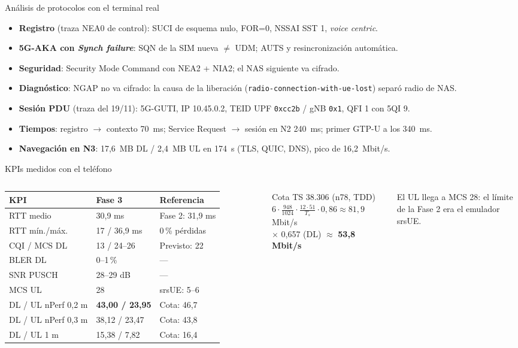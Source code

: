 \documentclass[aspectratio=169,10pt]{beamer}
\begin{document}
\begin{frame}{Análisis de protocolos con el terminal real}
\begin{itemize}
  \item \textbf{Registro} (traza NEA0 de control): SUCI de esquema nulo, FOR=0, NSSAI SST 1, \textit{voice centric}.
  \item \textbf{5G-AKA con \textit{Synch failure}}: SQN de la SIM nueva $\neq$ UDM; AUTS y resincronización automática.
  \item \textbf{Seguridad}: Security Mode Command con NEA2 + NIA2; el NAS siguiente va cifrado.
  \item \textbf{Diagnóstico}: NGAP no va cifrado: la causa de la liberación (\texttt{radio-connection-with-ue-lost}) separó radio de NAS.
  \item \textbf{Sesión PDU} (traza del 19/11): 5G-GUTI, IP 10.45.0.2, TEID UPF \texttt{0xcc2b} / gNB \texttt{0x1}, QFI 1 con 5QI 9.
  \item \textbf{Tiempos}: registro $\rightarrow$ contexto 70~ms; Service Request $\rightarrow$ sesión en N2 240~ms; primer GTP-U a los 340~ms.
  \item \textbf{Navegación en N3}: 17,6~MB DL / 2,4~MB UL en 174~s (TLS, QUIC, DNS), pico de 16,2~Mbit/s.
\end{itemize}
\end{frame}

\begin{frame}{KPIs medidos con el teléfono}
\begin{columns}[T]
\small
\begin{tabular}{lll}
\toprule
\textbf{KPI} & \textbf{Fase 3} & \textbf{Referencia} \\
\midrule
RTT medio & 30,9 ms & Fase 2: 31,9 ms \\
RTT mín./máx. & 17 / 36,9 ms & 0\,\% pérdidas \\
CQI / MCS DL & 13 / 24--26 & Previsto: 22 \\
BLER DL & 0--1\,\% & --- \\
SNR PUSCH & 28--29 dB & --- \\
MCS UL & 28 & srsUE: 5--6 \\
DL / UL nPerf 0,2 m & \textbf{43,00 / 23,95} & Cota: 46,7 \\
DL / UL nPerf 0,3 m & 38,12 / 23,47 & Cota: 43,8 \\
DL / UL 1 m & 15,38 / 7,82 & Cota: 16,4 \\
\bottomrule
\end{tabular}
\begin{block}{Cota TS 38.306 (n78, TDD)}
\small $6\cdot\frac{948}{1024}\cdot\frac{12\cdot51}{T_s}\cdot0{,}86 \approx 81{,}9$ Mbit/s\\
$\times$ 0,657 (DL) $\approx$ \textbf{53,8 Mbit/s}
\end{block}
\small El UL llega a MCS 28: el límite de la Fase 2 era el emulador srsUE.
\end{columns}
\end{frame}
\end{document}
